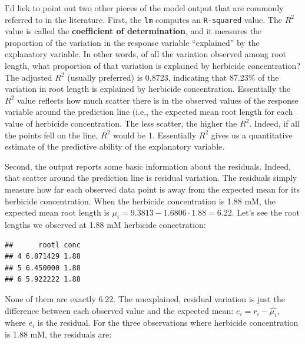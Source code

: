 \documentclass[
]{book}
\newenvironment{Shaded}{\begin{snugshade}}{\end{snugshade}}
\newcommand{\FloatTok}[1]{\textcolor[rgb]{0.00,0.00,0.81}{#1}}
\newcommand{\NormalTok}[1]{#1}
\newcommand{\SpecialCharTok}[1]{\textcolor[rgb]{0.81,0.36,0.00}{\textbf{#1}}}
\begin{document}
I'd liek to point out two other pieces of the model output that are commonly referred to in the literature. First, the \texttt{lm} computes an \texttt{R-squared} value. The \(R^2\) value is called the \textbf{coefficient of determination}, and it measures the proportion of the variation in the response variable ``explained'' by the explanatory variable. In other words, of all the variation observed among root length, what proportion of that variation is explained by herbicide concentration? The adjusted \(R^2\) (usually preferred) is 0.8723, indicating that 87.23\% of the variation in root length is explained by herbicide concentration. Essentially the \(R^2\) value reflects how much scatter there is in the observed values of the response variable around the prediction line (i.e., the expected mean root length for each value of herbicide concentration. The less scatter, the higher the \(R^2\). Indeed, if all the points fell on the line, \(R^2\) would be 1. Essentially \(R^2\) gives us a quantitative estimate of the predictive ability of the explanatory variable.

Second, the output reports some basic information about the residuals. Indeed, that scatter around the prediction line is residual variation. The residuals simply measure how far each observed data point is away from the expected mean for its herbicide concentration. When the herbicide concentration is 1.88 mM, the expected mean root length is \(\mu_i = 9.3813 -1.6806 \cdot 1.88 = 6.22\). Let's see the root lengths we observed at 1.88 mM herbicide concetration:

\begin{Shaded}
\end{Shaded}

\begin{verbatim}
##      rootl conc
## 4 6.871429 1.88
## 5 6.450000 1.88
## 6 5.922222 1.88
\end{verbatim}

None of them are exactly 6.22. The unexplained, residual variation is just the difference between each observed value and the expected mean: \(e_i = r_i - \hat{\mu_i}\), where \(e_i\) is the residual. For the three observations where herbicide concentration is 1.88 mM, the residuals are:
\end{document}
